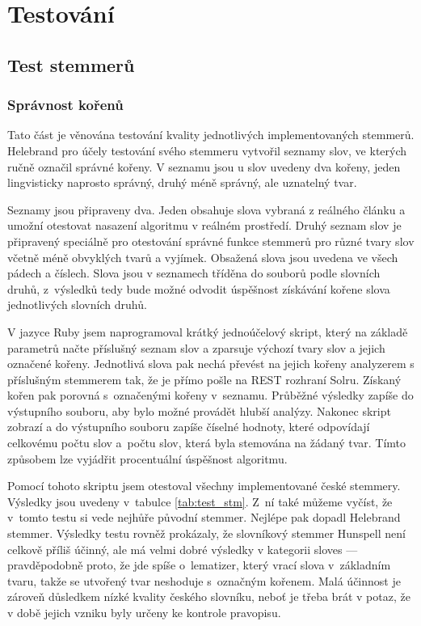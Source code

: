 \chapter{Testování} \label{testing}
\section{Test stemmerů}
\subsection{Správnost kořenů}
Tato část je věnována testování kvality jednotlivých implementovaných stemmerů. Helebrand pro účely testování svého stemmeru vytvořil seznamy slov, ve kterých ručně označil správné kořeny. V seznamu jsou u slov uvedeny dva kořeny, jeden lingvisticky naprosto správný, druhý méně správný, ale uznatelný tvar.

Seznamy jsou připraveny dva. Jeden obsahuje slova vybraná z reálného článku a umožní otestovat nasazení algoritmu v reálném prostředí. Druhý seznam slov je připravený speciálně pro otestování správné funkce stemmerů pro různé tvary slov včetně méně obvyklých tvarů a vyjímek. Obsažená slova jsou uvedena ve všech pádech a číslech. Slova jsou v seznamech tříděna do souborů podle slovních druhů, z~výsledků tedy bude možné odvodit úspěšnost získávání kořene slova jednotlivých slovních druhů.

V jazyce Ruby jsem naprogramoval krátký jednoúčelový skript, který na základě parametrů načte příslušný seznam slov a zparsuje výchozí tvary slov a jejich označené kořeny. Jednotlivá slova pak nechá převést na jejich kořeny analyzerem s příslušným stemmerem tak, že je přímo pošle na REST rozhraní Solru. Získaný kořen pak porovná s~označenými kořeny v~seznamu. Průběžné výsledky zapíše do výstupního souboru, aby bylo možné provádět hlubší analýzy. Nakonec skript zobrazí a  do výstupního souboru zapíše číselné hodnoty, které odpovídají celkovému počtu slov a~počtu slov, která byla stemována na žádaný tvar. Tímto způsobem lze vyjádřit procentuální úspěšnost algoritmu.

Pomocí tohoto skriptu jsem otestoval všechny implementované české stemmery. Výsledky jsou uvedeny v~tabulce \ref{tab:test_stm}. Z~ní také můžeme vyčíst, že v~tomto testu si vede nejhůře původní stemmer. Nejlépe pak dopadl Helebrand stemmer. Výsledky testu rovněž prokázaly, že slovníkový stemmer Hunspell není celkově příliš účinný, ale má velmi dobré výsledky v kategorii sloves --- pravděpodobně proto, že jde spíše o~lematizer, který vrací slova v~základním tvaru, takže se utvořený tvar neshoduje s~označným kořenem. Malá účinnost je zároveň důsledkem nízké kvality českého slovníku, neboť je třeba brát v potaz, že v době jejich vzniku byly určeny ke kontrole pravopisu.

